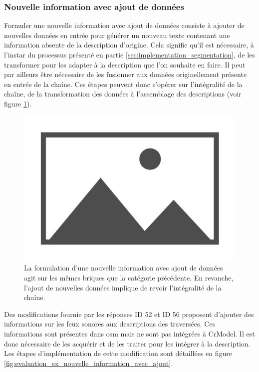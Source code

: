 \subsubsection{Nouvelle information avec ajout de données}

Formuler une nouvelle information avec ajout de données consiste à ajouter de nouvelles données en entrée pour générer un nouveau texte contenant une information absente de la description d'origine. Cela signifie qu'il est nécessaire, à l'instar du processus présenté en partie \ref{sec:implementation_segmentation}, de les transformer pour les adapter à la description que l'on souhaite en faire. Il peut par ailleurs être nécessaire de les fusionner aux données originellement présente en entrée de la chaîne. Ces étapes peuvent  donc s'opérer sur l'intégralité de la chaîne, de la transformation des données à l'assemblage des descriptions (voir figure \ref{fig:evaluation_nouvelle_information_avec_ajout}).

\begin{figure}[ht]
    \centering
    \includegraphics{images/placeholder.jpg}
    \caption{La formulation d'une nouvelle information avec ajout de données agit sur les mêmes briques que la catégorie précédente. En revanche, l'ajout de nouvelles données implique de revoir l'intégralité de la chaîne.}
    \label{fig:evaluation_nouvelle_information_avec_ajout}
\end{figure}

\newpar{}

Des modifications fournie par les réponses ID 52 et ID 56 proposent d'ajouter des informations sur les feux sonores aux descriptions des traversées. Ces informations sont présentes dans \gls{osm} mais ne sont pas intégrées à CrModel. Il est donc nécessaire de les acquérir et de les traiter pour les intégrer à la description. Les étapes d'implémentation de cette modification sont détaillées en figure \ref{fig:evaluation_ex_nouvelle_information_avec_ajout}.

